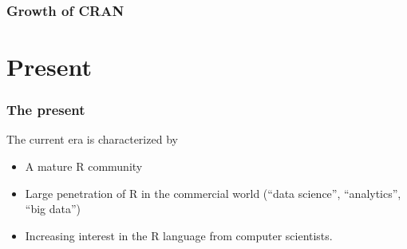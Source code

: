 \documentclass[svgnames]{beamer}
\begin{document}
\begin{frame}
  \frametitle{Growth of CRAN}

  \begin{center}

  \end{center}
  
\end{frame}

\section{Present}

\begin{frame}
  \frametitle{The present}

  The current era is characterized by
  \begin{itemize}
  \item A mature R community
  \item Large penetration of R in the commercial world (``data science'',
    ``analytics'', ``big data'')
  \item Increasing interest in the R language from computer scientists.
  \end{itemize}

\end{frame}
\end{document}
